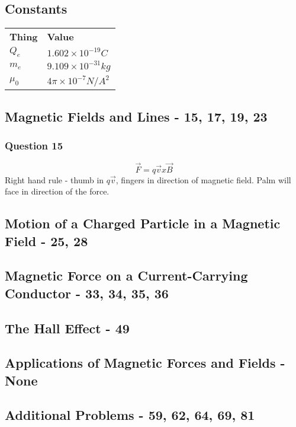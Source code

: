 \documentclass[12pt, letterpaper, twoside]{article}
\begin{document}
  \subsection*{Constants}
    \begin{tabular}{l l}
      \textbf{Thing} & \textbf{Value}\\
      $Q_e$ & $1.602 \times 10^{-19}C$\\
      $m_e$ & $9.109 \times 10^{-31}kg$\\
      $\mu_0$ & $4 \pi \times 10^{-7}N/A^ 2$
    
    \end{tabular}
  
  \setcounter{subsection}{1}
  \subsection{Magnetic Fields and Lines - 15, 17, 19, 23}
    \subsubsection*{Question 15}
      $$\vec{F} = q \vec{v} x \vec{B}$$
      Right hand rule - thumb in $q \vec{v}$, fingers in direction of magnetic field. Palm will face in direction of the force.
  
  \subsection{Motion of a Charged Particle in a Magnetic Field - 25, 28}
  
  
  \subsection{Magnetic Force on a Current-Carrying Conductor - 33, 34, 35, 36}
  
  
  \subsection{The Hall Effect - 49}
  
  
  \subsection{Applications of Magnetic Forces and Fields - None}
  
  
  \subsection{Additional Problems - 59, 62, 64, 69, 81}
    
\end{document}

